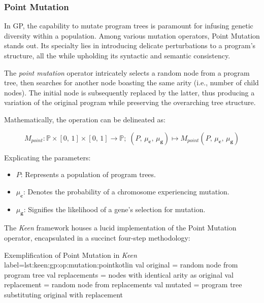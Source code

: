 \subsubsection{Point Mutation}
\label{sec:keen:gp:op:mutation:point}

    In GP, the capability to mutate program trees is paramount for infusing genetic diversity within a population. Among 
    various mutation operators, Point Mutation stands out. Its specialty lies in introducing delicate perturbations to a 
    program's structure, all the while upholding its syntactic and semantic consistency.

    \begin{definition}
        The \textit{point mutation} operator intricately selects a random node from a program tree, then searches for 
        another node boasting the same arity (i.e., number of child nodes). The initial node is subsequently replaced by 
        the latter, thus producing a variation of the original program while preserving the overarching tree structure.

        Mathematically, the operation can be delineated as:

        \begin{equation}
        M_{point}: \mathbb{P} \times [0,\, 1] \times [0,\, 1] \to \mathbb{P};\;
        (P,\, \mu_\textbf{c},\, \mu_\textbf{g}) \mapsto M_{point}(P,\, \mu_\textbf{c},\, \mu_\textbf{g})
        \end{equation}

        Explicating the parameters:

        \begin{itemize}
        \item \(P\): Represents a population of program trees.
        \item \(\mu_\textbf{c}\): Denotes the probability of a chromosome experiencing mutation.
        \item \(\mu_\textbf{g}\): Signifies the likelihood of a gene's selection for mutation.
        \end{itemize}
    \end{definition}

    The \textit{Keen} framework houses a lucid implementation of the Point Mutation operator, encapsulated in a succinct 
    four-step methodology:

    \begin{code}{
        Exemplification of Point Mutation in \textit{Keen}
    }{label=lst:keen:gp:op:mutation:point}{kotlin}
        val original = random node from program tree
        val replacements = nodes with identical arity as original
        val replacement = random node from replacements
        val mutated = program tree substituting original with replacement
    \end{code}

